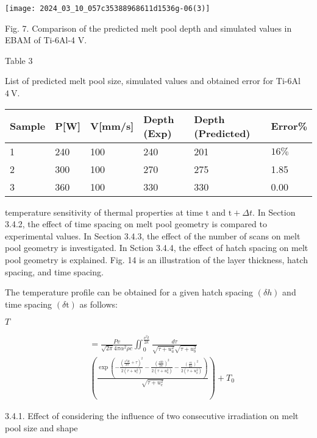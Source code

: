 \documentclass[10pt]{article}
\begin{document}
\begin{center}
\texttt{[image: 2024\_03\_10\_057c35388968611d1536g-06(3)]}
\end{center}

Fig. 7. Comparison of the predicted melt pool depth and simulated values in EBAM of Ti-6Al-4 V.

Table 3

List of predicted melt pool size, simulated values and obtained error for Ti-6Al$4 \mathrm{~V}$.

\begin{center}
\begin{tabular}{llllll}
\hline
Sample & P[W] & V[mm/s] & Depth (Exp) & Depth (Predicted) & Error\% \\
\hline
1 & 240 & 100 & 240 & 201 & $16 \%$ \\
2 & 300 & 100 & 270 & 275 & 1.85 \\
3 & 360 & 100 & 330 & 330 & 0.00 \\
\hline
\end{tabular}
\end{center}

temperature sensitivity of thermal properties at time $\mathrm{t}$ and $\mathrm{t}+\Delta t$. In Section 3.4.2, the effect of time spacing on melt pool geometry is compared to experimental values. In Section 3.4.3, the effect of the number of scans on melt pool geometry is investigated. In Sction 3.4.4, the effect of hatch spacing on melt pool geometry is explained. Fig. 14 is an illustration of the layer thickness, hatch spacing, and time spacing.

The temperature profile can be obtained for a given hatch spacing $(\delta h)$ and time spacing $(\delta \mathrm{t})$ as follows:

$T$

$$
\begin{aligned}
& =\frac{P v}{\sqrt{2 \pi} 4 \pi \alpha^{2} \rho c} \iint_{0}^{\frac{v^{2} t}{2 k}} \frac{d \tau}{\sqrt{\tau+u_{a}^{2}} \sqrt{\tau+u_{b}^{2}}} \\
& \left(\frac{\exp \left(-\frac{\left(\frac{v^{2} \delta t}{2 \alpha}+\tau\right)^{2}}{2\left(\tau+u_{c}^{2}\right)}-\frac{\left(\frac{v \delta h}{2 \alpha}\right)^{2}}{2\left(\tau+u_{a}^{2}\right)}-\frac{\left(\frac{v z}{2 \alpha}\right)^{2}}{2\left(\tau+u_{b}^{2}\right)}\right)}{\sqrt{\tau+u_{c}^{2}}}\right)+T_{0}
\end{aligned}
$$

3.4.1. Effect of considering the influence of two consecutive irradiation on melt pool size and shape
\end{document}
